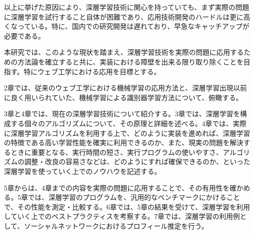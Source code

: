 以上に挙げた原因により、深層学習技術に関心を持っていても、まず実際の問題に深層学習を試行すること自体が困難であり、応用技術開発のハードルは更に高くなっている。特に、国内での研究開発は遅れており、早急なキャッチアップが必要である。\par
本研究では、このような現状を踏まえ、深層学習技術を実際の問題に応用するための方法論を確立すると共に、実装における障壁を出来る限り取り除くことを目指す。特にウェブ工学における応用を目標とする。\par
2章では、従来のウェブ工学における機械学習の応用方法と、深層学習出現以前に良く用いられていた、機械学習による識別器学習方法について、俯瞰する。
\par3章と4章では、現在の深層学習技術について紹介する。3章では、深層学習を構成する個々のアルゴリズムについて、その原理と詳細を述べる。4章では、実際に深層学習アルゴリズムを利用する上で、どのように実装を進めれば、深層学習の特徴である高い学習性能を確実に利用できるのか、また、現実の問題を解決するときに重要となる、実行時間の短さ、実行プログラムの使いやすさ、アルゴリズムの調整・改良の容易さなどは、どのようにすれば確保できるのか、といった深層学習を使っていく上でのノウハウを記述する。\par
5章からは、4章までの内容を実際の問題に応用することで、その有用性を確かめる。5章では、深層学習のプログラムを、汎用的なベンチマークにかけることで、その性能を測定・比較する。6章では、5章の結果を受けて、深層学習を利用していく上でのベストプラクティスを考察する。7章では、深層学習の利用例として、ソーシャルネットワークにおけるプロフィール推定を行う。

